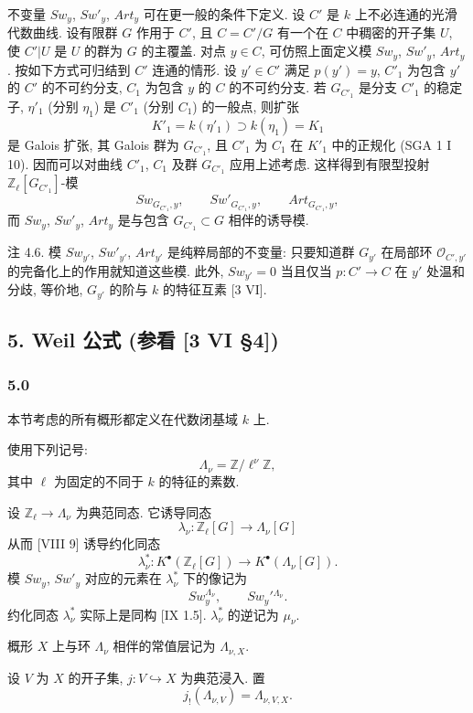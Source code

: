 不变量 $Sw_y$, $Sw'_y$, $Art_y$ 可在更一般的条件下定义. 设 $C'$ 是 $k$ 上不必连通的光滑代数曲线. 设有限群 $G$ 作用于 $C'$, 且 $C=C'/G$ 有一个在 $C$ 中稠密的开子集 $U$, 使 $C'|U$ 是 $U$ 的群为 $G$ 的主覆盖. 对点 $y\in C$, 可仿照上面定义模 $Sw_y$, $Sw'_y$, $Art_y$. 按如下方式可归结到 $C'$ 连通的情形. 设 $y'\in C'$ 满足 $p(y')=y$, $C'_1$ 为包含 $y'$ 的 $C'$ 的不可约分支, $C_1$ 为包含 $y$ 的 $C$ 的不可约分支. 若 $G_{C'_1}$ 是分支 $C'_1$ 的稳定子, $\eta'_1$ (分别 $\eta_1$) 是 $C'_1$ (分别 $C_1$) 的一般点, 则扩张
\[
K'_1=k(\eta'_1)\supset k(\eta_1)=K_1
\]
是 Galois 扩张, 其 Galois 群为 $G_{C'_1}$, 且 $C'_1$ 为 $C_1$ 在 $K'_1$ 中的正规化 (SGA 1 I 10). 因而可以对曲线 $C'_1$, $C_1$ 及群 $G_{C'_1}$ 应用上述考虑. 这样得到有限型投射 $\mathbb Z_\ell[G_{C'_1}]$-模
\[
Sw_{G_{C'_1},y},\qquad Sw'_{G_{C'_1},y},\qquad Art_{G_{C'_1},y},
\]
而 $Sw_y$, $Sw'_y$, $Art_y$ 是与包含 $G_{C'_1}\subset G$ 相伴的诱导模.

注 4.6. 模 $Sw_{y'}$, $Sw'_{y'}$, $Art_{y'}$ 是纯粹局部的不变量: 只要知道群 $G_{y'}$ 在局部环 $\mathcal O_{C',y'}$ 的完备化上的作用就知道这些模. 此外, $Sw_{y'}=0$ 当且仅当 $p:C'\to C$ 在 $y'$ 处温和分歧, 等价地, $G_{y'}$ 的阶与 $k$ 的特征互素 [3 VI].

\subsection*{5. Weil 公式 (参看 [3 VI §4])}

\subsubsection*{5.0}

本节考虑的所有概形都定义在代数闭基域 $k$ 上.

使用下列记号:
\[
\Lambda_\nu=\mathbb Z/\ell^\nu\mathbb Z,
\]
其中 $\ell$ 为固定的不同于 $k$ 的特征的素数.

设 $\mathbb Z_\ell\to\Lambda_\nu$ 为典范同态. 它诱导同态
\[
\lambda_\nu:\mathbb Z_\ell[G]\longrightarrow \Lambda_\nu[G]
\]
从而 [VIII 9] 诱导约化同态
\[
\lambda_\nu^*:K^{\bullet}(\mathbb Z_\ell[G])\longrightarrow K^{\bullet}(\Lambda_\nu[G]).
\]
模 $Sw_y$, $Sw'_y$ 对应的元素在 $\lambda_\nu^*$ 下的像记为
\[
Sw_y^{\Lambda_\nu},\qquad Sw_y'{}^{\Lambda_\nu}.
\]
约化同态 $\lambda_\nu^*$ 实际上是同构 [IX 1.5]. $\lambda_\nu^*$ 的逆记为 $\mu_\nu$.

概形 $X$ 上与环 $\Lambda_\nu$ 相伴的常值层记为 $\Lambda_{\nu,X}$.

设 $V$ 为 $X$ 的开子集, $j:V\hookrightarrow X$ 为典范浸入. 置
\[
j_!(\Lambda_{\nu,V})=\Lambda_{\nu,V,X}.
\]

